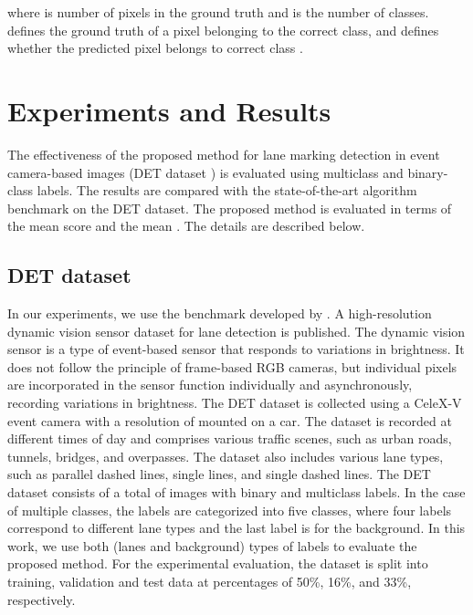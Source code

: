 \documentclass[journal]{IEEEtran}
\begin{document}
where  is number of pixels in the ground truth and  is the number of classes.  defines the ground truth of a pixel belonging to the correct class, and  defines whether the predicted pixel belongs to correct class . 
\section{Experiments and Results}
The effectiveness of the proposed method for lane marking detection in event camera-based images (DET dataset \cite{Cheng2019}) is evaluated using multiclass and binary-class labels. The results are compared with the state-of-the-art algorithm benchmark on the DET dataset. The proposed method is evaluated in terms of the mean  score and the mean . The details are described below.
\subsection{DET dataset}
In our experiments, we use the benchmark developed by \cite{Cheng2019}.
A high-resolution dynamic vision sensor dataset for lane detection is published. The dynamic vision sensor is a type of event-based sensor that responds to variations in brightness. It does not follow the principle of frame-based RGB cameras, 
but individual pixels are incorporated in the sensor function individually and asynchronously, recording variations in brightness. The DET dataset is collected using a CeleX-V event camera with a resolution of  mounted on a car. The dataset is recorded at different times of day and comprises various traffic scenes, such as urban roads, tunnels, bridges, and overpasses. The dataset also includes various lane types, such as parallel dashed lines, single lines, and single dashed lines.
The DET dataset consists of a total of  images with binary and multiclass labels. In the case of multiple classes, the labels are categorized into five classes, where four labels correspond to different lane types and the last label is for the background. In this work, we use both (lanes and background) types of labels to evaluate the proposed method. For the experimental evaluation, the dataset is split into training, validation and test data at percentages of 50\%, 16\%, and 33\%, respectively.
\end{document}
